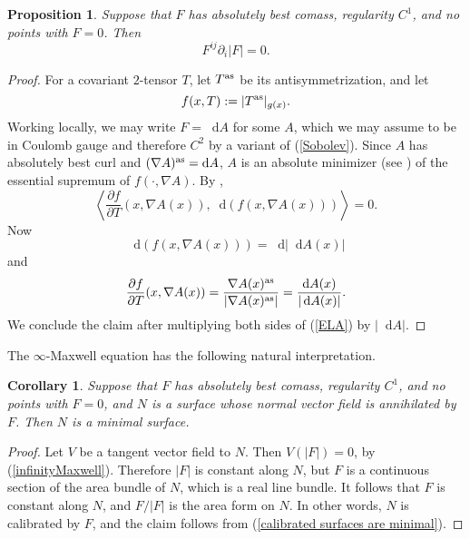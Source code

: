 \documentclass[reqno,11pt]{amsart}
\newcommand*\dif{\mathop{}\!\mathrm{d}}
\newtheorem{proposition}[theorem]{Proposition}
\newtheorem{corollary}[theorem]{Corollary}
\theoremstyle{definition}
\numberwithin{equation}{section}
\begin{document}
\begin{proposition}
Suppose that $F$ has absolutely best comass, regularity $C^1$, and no points with $F = 0$. Then
\begin{equation}\label{infinityMaxwell}
	F^{ij} \partial_i |F| = 0.
\end{equation}
\end{proposition}
\begin{proof}
For a covariant $2$-tensor $T$, let $T^{\rm as}$ be its antisymmetrization, and let
$$f(x, T) := |T^{\rm as}|_{g(x)}.$$
Working locally, we may write $F = \dif A$ for some $A$, which we may assume to be in Coulomb gauge and therefore $C^2$ by a variant of (\ref{Sobolev}).
Since $A$ has absolutely best curl and $(\nabla A)^{\rm as} = \dif A$, $A$ is an absolute minimizer (see \cite[Definition 5.1]{Barron2001}) of the essential supremum of $f(\cdot, \nabla A)$.
By \cite[Theorem 5.2]{Barron2001},
\begin{equation}\label{ELA}
	\left\langle \frac{\partial f}{\partial T}(x, \nabla A(x)), \dif (f(x, \nabla A(x))) \right\rangle = 0.
\end{equation}
Now
$$\dif(f(x, \nabla A(x))) = \dif |\dif A(x)|$$
and 
$$\frac{\partial f}{\partial T}(x, \nabla A(x)) = \frac{\nabla A(x)^{\rm as}}{|\nabla A(x)^{\rm as}|} = \frac{\dif A(x)}{|\dif A(x)|}.$$
We conclude the claim after multiplying both sides of (\ref{ELA}) by $|\dif A|$.
\end{proof}

The $\infty$-Maxwell equation has the following natural interpretation.

\begin{corollary}
Suppose that $F$ has absolutely best comass, regularity $C^1$, and no points with $F = 0$, and $N$ is a surface whose normal vector field is annihilated by $F$.
Then $N$ is a minimal surface.
\end{corollary}
\begin{proof}
Let $V$ be a tangent vector field to $N$. Then $V(|F|) = 0$, by (\ref{infinityMaxwell}).
Therefore $|F|$ is constant along $N$, but $F$ is a continuous section of the area bundle of $N$, which is a real line bundle.
It follows that $F$ is constant along $N$, and $F/|F|$ is the area form on $N$.
In other words, $N$ is calibrated by $F$, and the claim follows from (\ref{calibrated surfaces are minimal}).
\end{proof}

\printbibliography
\end{document}
